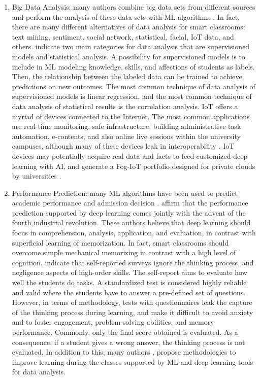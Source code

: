 \documentclass[english]{textolivre}
\begin{document}
\begin{enumerate}
  \item Big Data Analysis: many authors combine big data sets from
  different sources and perform the analysis of these data sets with ML
  algorithms \cite{Bhatnagar2023,Chai2024,Bansal2023,Madhani2022,Li2023}. In
  fact, there are many different alternatives of data analysis for smart
  classrooms: text mining, sentiment, social network, statistical,
  facial, IoT data, and others. \textcite{Zhu2023} indicate two
  main categories for data analysis that are supervisioned models and
  statistical analysis. A possibility for supervisioned models is to
  include in ML modeling knowledge, skills, and affections of students
  as labels. Then, the relationship between the labeled data can be
  trained to achieve predictions on new outcomes. The most common
  technique of data analysis of supervisioned models is linear
  regression, and the most common technique of data analysis of
  statistical results is the correlation analysis. 
  IoT offers a myriad of devices connected to the Internet. The most
  common applications are real-time monitoring, safe infrastructure,
  building administrative task automation, e-contents, and also online
  live sessions within the university campuses, although many of these
  devices leak in interoperability \cite{Bhatnagar2023}. IoT devices
  may potentially acquire real data and facts to feed customized deep
  learning with AI, and generate a Fog-IoT portfolio designed for
  private clouds by universities \cite{Bhatnagar2023}.

  \item Performance Prediction: many ML algorithms have been used to
  predict academic performance and admission decision \cite{Zhu2023}.
  \textcite{He2022} affirm that the performance prediction supported by
  deep learning comes jointly with the advent of the fourth industrial
  revolution. These authors believe that deep learning should focus in
  comprehension, analysis, application, and evaluation, in contrast with
  superficial learning of memorization. In fact, smart classrooms should
  overcome simple mechanical memorizing in contrast with a high level of
  cognition. \textcite{Zhu2023} indicate that self-reported
  surveys ignore the thinking process, and negligence aspects of
  high-order skills. The self-report aims to evaluate how well the
  students do tasks. A standardized test is considered highly reliable
  and valid where the students have to answer
  a pre-defined set of questions. However, in terms of methodology,
  tests with questionnaires leak the capture of the thinking process
  during learning, and make it difficult to avoid anxiety and to foster
  engagement, problem-solving abilities, and memory performance.
  Commonly, only the final score obtained is evaluated. As a
  consequence, if a student gives a wrong answer, the thinking process
  is not evaluated. In addition to this, many authors \cite{He2022},
  \textcite{Luan2021,Zhang2021,Zhang2022,Wu2021} propose methodologies to improve learning during the
  classes supported by ML and deep learning tools for data analysis.


\end{enumerate}
\end{document}
